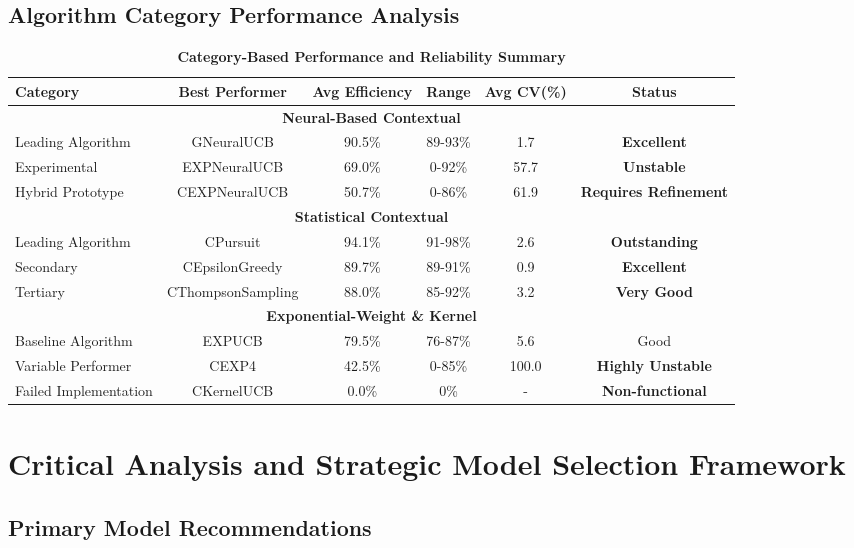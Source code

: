 \documentclass[12pt,a4paper]{article}
\newcommand{\performance}[1]{\textcolor{performancecolor}{\textbf{#1}}}
\newcommand{\critical}[1]{\textcolor{criticalcolor}{\textbf{#1}}}
\newcommand{\success}[1]{\textcolor{successcolor}{\textbf{#1}}}
\begin{document}
\subsection{Algorithm Category Performance Analysis}

\begin{table}[H]
\centering
\caption{\performance{Category-Based Performance and Reliability Summary}}
\begin{tabular}{|l|c|c|c|c|c|}
\hline
\textbf{Category} & \textbf{Best Performer} & \textbf{Avg Efficiency} & \textbf{Range} & \textbf{Avg CV(\%)} & \textbf{Status} \\
\hline
\hline
\multicolumn{6}{|c|}{\textbf{Neural-Based Contextual}} \\
\hline
Leading Algorithm & GNeuralUCB & 90.5\% & 89-93\% & 1.7 & \success{Excellent} \\
Experimental & EXPNeuralUCB & 69.0\% & 0-92\% & 57.7 & \critical{Unstable} \\
Hybrid Prototype & CEXPNeuralUCB & 50.7\% & 0-86\% & 61.9 & \critical{Requires Refinement} \\
\hline
\multicolumn{6}{|c|}{\textbf{Statistical Contextual}} \\
\hline
Leading Algorithm & CPursuit & 94.1\% & 91-98\% & 2.6 & \success{Outstanding} \\
Secondary & CEpsilonGreedy & 89.7\% & 89-91\% & 0.9 & \success{Excellent} \\
Tertiary & CThompsonSampling & 88.0\% & 85-92\% & 3.2 & \success{Very Good} \\
\hline
\multicolumn{6}{|c|}{\textbf{Exponential-Weight \& Kernel}} \\
\hline
Baseline Algorithm & EXPUCB & 79.5\% & 76-87\% & 5.6 & Good \\
Variable Performer & CEXP4 & 42.5\% & 0-85\% & 100.0 & \critical{Highly Unstable} \\
Failed Implementation & CKernelUCB & 0.0\% & 0\% & - & \critical{Non-functional} \\
\hline
\end{tabular}
\end{table}

\section{Critical Analysis and Strategic Model Selection Framework}

\subsection{Primary Model Recommendations}
\end{document}
